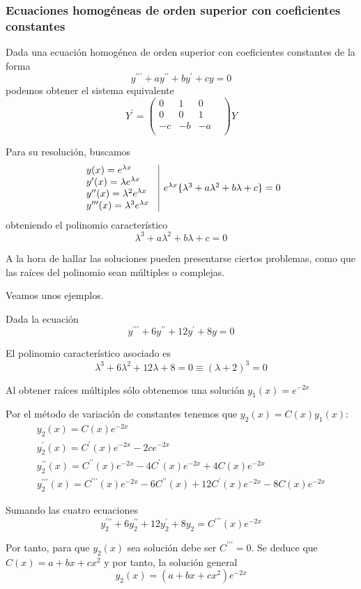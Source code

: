 \documentclass{mathnotes}
\begin{document}
\subsubsection{Ecuaciones homogéneas de orden superior con coeficientes constantes}
Dada una ecuación homogénea de orden superior con coeficientes constantes de la forma
 $$y^{\prime\prime\prime} + ay^{\prime\prime}+by^{\prime}+cy = 0$$ podemos obtener el sistema equivalente
$$Y^\prime = \begin{pmatrix}
0& 1& 0\\
0& 0& 1&\\
-c& -b& -a\\
\end{pmatrix}Y$$

Para su resolución, buscamos
$$\begin{array}{c | c}

\begin{array}{l}
y(x) = e^{\lambda x}\\
y^\prime(x) = \lambda e^{\lambda x}\\
y^{\prime\prime}(x) = \lambda^2 e^{\lambda x}\\
y^{\prime\prime\prime}(x) = \lambda^3 e^{\lambda x}\\
\end{array} & e^{\lambda x} \{ \lambda^3 + a\lambda^2 + b \lambda + c \} = 0
\end{array}
$$
obteniendo el polinomio característico $$\lambda^3 + a\lambda^2 + b \lambda + c = 0$$

A la hora de hallar las soluciones pueden presentarse ciertos problemas, como que las raíces del polinomio sean múltiples o complejas.

Veamos unos ejemplos.

\begin{example}
Dada la ecuación
$$y^{\prime\prime\prime} + 6 y^{\prime\prime} + 12y^\prime + 8y = 0$$

El polinomio característico asociado es $$ \lambda^3 + 6\lambda^2 + 12\lambda + 8 = 0 \equiv (\lambda + 2)^3 = 0$$

Al obtener raíces múltiples sólo obtenemos una solución $y_1(x) = e^{-2x}$

Por el método de variación de constantes tenemos que $y_2(x) = C(x) y_1(x)$:
$$\begin{array}{l}
y_2(x) = C(x) e^{-2x}\\
y_2^\prime(x) = C^\prime(x) e^{-2x}-2ce^{-2x}\\
y_2^{\prime\prime}(x) = C^{\prime\prime}(x) e^{-2x}-4C^\prime(x) e^{-2x}+4C(x)e^{-2x}\\
y_2^{\prime\prime\prime}(x) = C^{\prime\prime\prime}(x) e^{-2x}-6C^{\prime\prime}(x) +12C^\prime(x) e^{-2x}-8C(x)e^{-2x}
\end{array}
$$

Sumando las cuatro ecuaciones $$y^{\prime\prime\prime}_2+6y^{\prime\prime}_2+12y^\prime_2+8y_2 = C^{\prime\prime\prime}(x) e^{-2x}$$

Por tanto, para que $y_2(x)$ sea solución debe ser $C^{\prime\prime\prime} = 0$. Se deduce que $C(x) = a+bx+cx^2$ y por tanto, la solución general $$y_2(x) = (a+bx+cx^2)e^{-2x}$$
\end{example}
\end{document}
